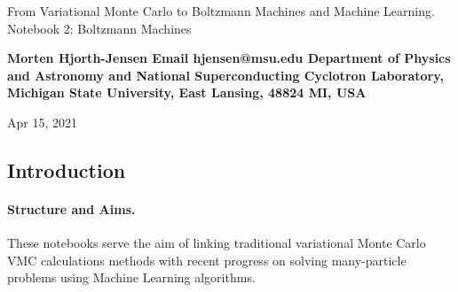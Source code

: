 \documentclass[%
oneside,                 %
final,                   %
10pt]{article}
\begin{document}

\newcommand{\exercisesection}[1]{\subsection*{#1}}






\thispagestyle{empty}

\begin{center}
{\LARGE\bf
\begin{spacing}{1.25}
From Variational Monte Carlo to Boltzmann Machines and Machine Learning. Notebook 2: Boltzmann Machines 
\end{spacing}
}
\end{center}


\begin{center}
{\bf Morten Hjorth-Jensen  Email hjensen@msu.edu  Department of Physics and Astronomy and National Superconducting Cyclotron Laboratory, Michigan State University, East Lansing, 48824 MI, USA${}^{}$} \\ [0mm]
\end{center}

\begin{center}
\end{center}
    

\begin{center}
Apr 15, 2021
\end{center}

\vspace{1cm}


\subsection{Introduction}

\paragraph{Structure and Aims.}
These notebooks serve the aim of linking traditional variational Monte
Carlo VMC calculations methods with recent progress on solving
many-particle problems using Machine Learning algorithms.
\end{document}
